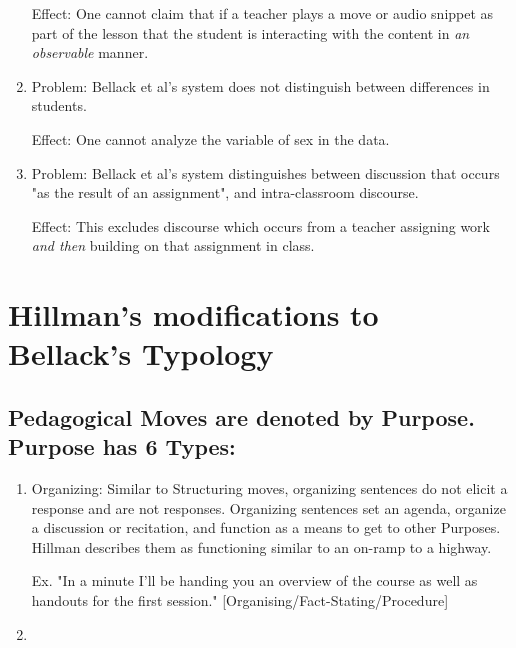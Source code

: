 \documentclass[10pt, letterpaper]{article}
\begin{document}
\begin{enumerate}
Effect: One cannot claim that if a teacher plays a move or audio snippet
as part of the lesson that the student is interacting with the content in
\emph{an observable} manner.
\item Problem: Bellack et al's system does not distinguish between differences
in students.

Effect: One cannot analyze the variable of sex in the data.
\item Problem: Bellack et al's system distinguishes between discussion that
occurs "as the result of an assignment", and intra-classroom discourse.

Effect: This excludes discourse which occurs from a teacher assigning work
\emph{and then} building on that assignment in class.
\end{enumerate}

\section*{Hillman's modifications to Bellack's Typology}
\label{sec:org2f504bb}
\subsection*{Pedagogical Moves are denoted by Purpose. Purpose has 6 Types:}
\label{sec:org955226b}
\begin{enumerate}
\item Organizing: Similar to Structuring moves, organizing sentences do not
elicit a response and are not responses. Organizing sentences set an
agenda, organize a discussion or recitation, and function as a means to
get to other Purposes. Hillman describes them as functioning similar to an
on-ramp to a highway.

Ex. "In a minute I'll be handing you an overview of the course as well as
handouts for the first session." [Organising/Fact-Stating/Procedure]

\item 
\end{enumerate}
\end{document}
